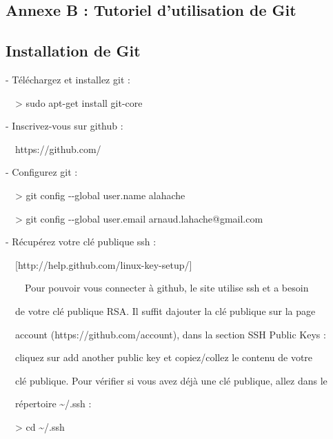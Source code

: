 \documentclass{mise_en_page}
\begin{document}
\subsection{Annexe B : Tutoriel d’utilisation de Git}



\subsection{Installation de Git}



{}- Téléchargez et installez git :

\ \ {\textgreater} sudo apt-get install git-core







{}- Inscrivez-vous sur github :

\ \ https://github.com/







{}- Configurez git :

\ \ {\textgreater} git config -{}-global user.name
{\textquotedbl}alahache{\textquotedbl}

\ \ {\textgreater} git config -{}-global user.email
arnaud.lahache@gmail.com







{}- Récupérez votre clé publique ssh :

\ \ [http://help.github.com/linux-key-setup/]




\ \ \ \ Pour pouvoir vous connecter à github, le site utilise ssh et a
besoin

\ \ de votre clé publique RSA. Il suffit d{\textquotesingle}ajouter la
clé publique sur la page

\ \ {\textquotedbl}account{\textquotedbl} (https://github.com/account),
dans la section {\textquotedbl}SSH Public Keys{\textquotedbl} :

\ \ cliquez sur {\textquotedbl}add another public key{\textquotedbl} et
copiez/collez le contenu de votre

\ \ clé publique. Pour vérifier si vous avez déjà une clé publique,
allez dans le

\ \ répertoire \~{}/.ssh :




\ \ {\textgreater} cd \~{}/.ssh
\end{document}
